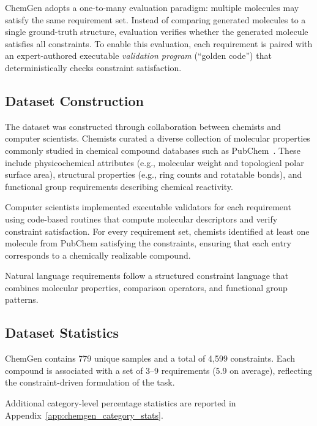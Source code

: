 \documentclass[10pt]{article} %
\begin{document}
ChemGen adopts a one-to-many evaluation paradigm: multiple molecules may satisfy the same requirement set. Instead of comparing generated molecules to a single ground-truth structure, evaluation verifies whether the generated molecule satisfies all constraints. To enable this evaluation, each requirement is paired with an expert-authored executable \textit{validation program} (``golden code'') that deterministically checks constraint satisfaction.

\subsection{Dataset Construction}

The dataset was constructed through collaboration between chemists and computer scientists. Chemists curated a diverse collection of molecular properties commonly studied in chemical compound databases such as PubChem~\cite{kim2023pubchem}. These include physicochemical attributes (e.g., molecular weight and topological polar surface area), structural properties (e.g., ring counts and rotatable bonds), and functional group requirements describing chemical reactivity.

Computer scientists implemented executable validators for each requirement using code-based routines that compute molecular descriptors and verify constraint satisfaction. For every requirement set, chemists identified at least one molecule from PubChem satisfying the constraints, ensuring that each entry corresponds to a chemically realizable compound.

Natural language requirements follow a structured constraint language that combines molecular properties, comparison operators, and functional group patterns.

\subsection{Dataset Statistics}

ChemGen contains 779 unique samples and a total of 4,599 constraints. Each compound is associated with a set of 3--9 requirements (5.9 on average), reflecting the constraint-driven formulation of the task. 

Additional category-level percentage statistics are reported in Appendix~\ref{app:chemgen_category_stats}.
\end{document}

